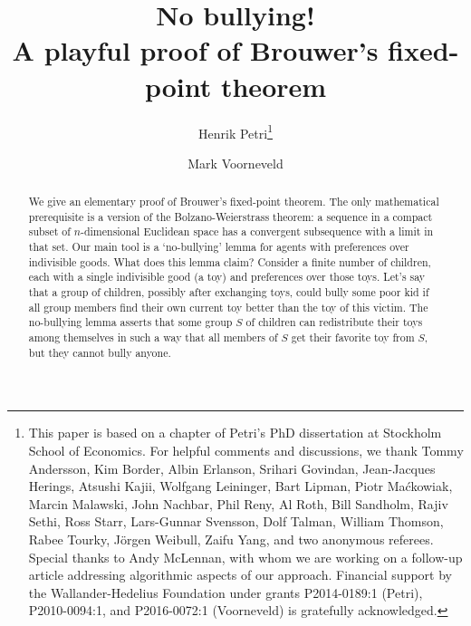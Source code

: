 \documentclass[english, 11pt]{article}
\theoremstyle{plain} %
\theoremstyle{definition}
\begin{document}
\title{No bullying! \\ A playful proof of Brouwer's fixed-point theorem}

\author[1]{Henrik Petri\thanks{This paper is based on a chapter of Petri's PhD dissertation at Stockholm School of Economics. For helpful comments and discussions, we thank Tommy Andersson, Kim Border, Albin Erlanson, Srihari Govindan, Jean-Jacques Herings, Atsushi Kajii, Wolfgang Leininger, Bart Lipman, Piotr Ma\'{c}kowiak, Marcin Malawski, John Nachbar, Phil Reny, Al Roth, Bill Sandholm, Rajiv Sethi, Ross Starr, Lars-Gunnar Svensson, Dolf Talman, William Thomson, Rabee Tourky, J\"{o}rgen Weibull, Zaifu Yang, and two anonymous referees. Special thanks to Andy McLennan, with whom we are working on a follow-up article addressing algorithmic aspects of our approach. Financial support by the Wallander-Hedelius Foundation under grants P2014-0189:1 (Petri), P2010-0094:1, and P2016-0072:1 (Voorneveld) is gratefully acknowledged.}}


\author[2]{Mark Voorneveld}


\maketitle

\begin{abstract}
We give an elementary proof of Brouwer's fixed-point theorem. The only mathematical prerequisite is a version of the Bolzano-Weierstrass theorem: a sequence in a compact subset of $n$-dimensional Euclidean space has a convergent subsequence with a limit in that set. Our main tool is a `no-bullying' lemma for agents with preferences over indivisible goods. What does this lemma claim? Consider a finite number of children, each with a single indivisible good (a toy) and preferences over those toys. Let's say that a group of children, possibly after exchanging toys, could bully some poor kid if all group members find their own current toy better than the toy of this victim. The no-bullying lemma asserts that some group $S$ of children can redistribute their toys among themselves in such a way that all members of $S$ get their favorite toy from $S$, but they cannot bully anyone.
\end{abstract}
\end{document}
